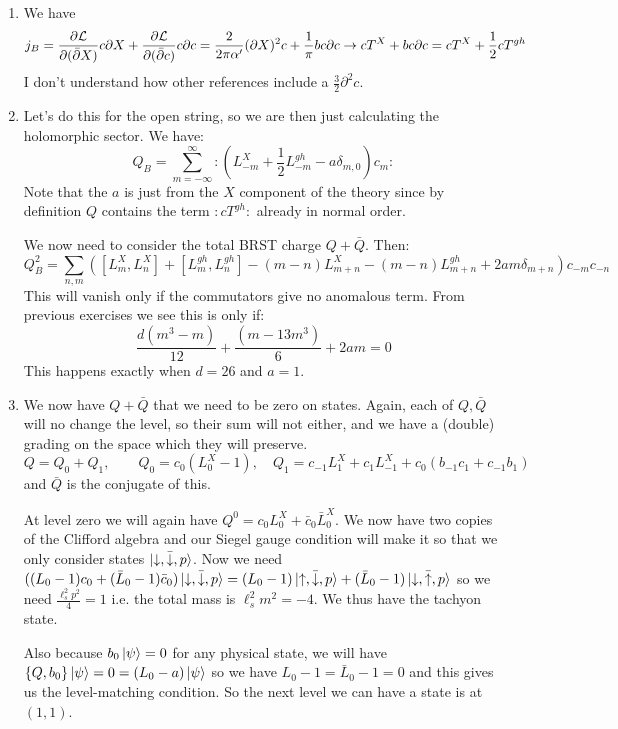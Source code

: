 \documentclass[11pt, class=article, crop=false]{standalone}
\begin{document}
\begin{enumerate}
	  \item We have
	  \[
	  	j_B = \frac{\partial \mathcal L}{\partial (\bar {\partial} X)} c \partial X + \frac{\partial \mathcal L}{\partial (\bar {\partial} c)} c \partial c 
		= \frac{2}{2 \pi \alpha'} (\partial X)^2 c + \frac1\pi b c \partial c 
		\to c T^X + b c \partial c = c T^X + \frac12 c T^{gh}
	  \]
	  I don't understand how other references include a $\frac32 \partial^2 c$.
	  
	  \item Let's do this for the open string, so we are then just calculating the holomorphic sector. We have:
	  \[
	  	Q_B = \sum_{m=-\infty}^\infty :(L_{-m}^X + \frac12 L_{-m}^{gh} - a \delta_{m, 0}) c_{m}:
	  \]
	  Note that the $a$ is just from the $X$ component of the theory since by definition $Q$ contains the term $:c T^{gh}:$ already in normal order.
	  	  
	  We now need to consider the total BRST charge $Q + \bar Q$. Then:
	  \[
	  	Q_{B}^2 = \sum_{n,m} ([L_m^X, L_n^X] + [L_m^{gh}, L_n^{gh}] - (m-n) L_{m+n}^X - (m-n) L_{m+n}^{gh} + 2 a m \delta_{m+n})c_{-m} c_{-n}
	  \]
	  This will vanish only if the commutators give no anomalous term. From previous exercises we see this is only if: 
	  \[
	  	\frac{d(m^3 - m)}{12} + \frac{(m - 13 m^3)}{6} + 2 a m = 0
	  \]
	  This happens exactly when $d = 26$ and $a = 1$.
	  
	  \item We now have $Q + \bar Q$ that we need to be zero on states. Again, each of $Q, \bar Q$ will no change the level, so their sum will not either, and we have a (double) grading on the space which they will preserve. 
	  \[
	  	Q= Q_0 + Q_1, \qquad Q_0 = c_0 (L_0^X - 1), \quad Q_1 = c_{-1} L_1^X + c_1 L_{-1}^X + c_0 (b_{-1} c_1 + c_{-1} b_1)
	  \]
	  and $\bar Q$ is the conjugate of this.
	  
	  At level zero we will again have $Q^0 = c_0 L_0^X + \bar c_0 \bar L^X_0 $. We now have two copies of the Clifford algebra and our Siegel gauge condition will make it so that we only consider states $\ket{\downarrow, \bar \downarrow, p}$. Now we need $((L_0 - 1) c_0 + (\bar L_0 - 1) \bar c_0) \ket{\downarrow, \bar \downarrow, p} = (L_0 - 1) \ket{\uparrow, \bar \downarrow, p} + (\bar L_0 - 1) \ket{\downarrow, \bar \uparrow, p}$ so we need $\frac{\ell_s^2 p^2}4 = 1$ i.e. the total  mass is $\ell_s^2 m^2 = -4$. We thus have the tachyon state.
	  
	  Also because $b_0 \ket{\psi} = 0$ for any physical state, we will have $\{ Q, b_0 \} \ket{\psi} = 0 = (L_0 - a) \ket{\psi}$ so we have $L_0 - 1 = \bar L_0 - 1 = 0$ and this gives us the level-matching condition. So the next level we can have a state is at $(1,1)$.
	  

\end{enumerate}
\end{document}
